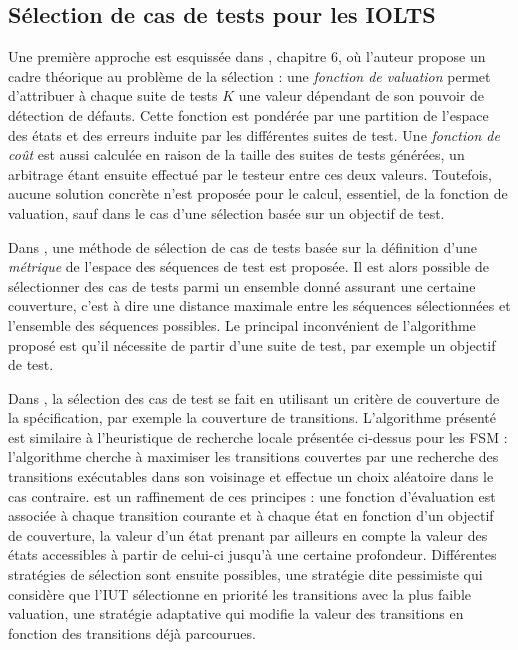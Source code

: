 \subsection{S\'election de cas de tests pour les \textsf{IOLTS}}
\label{sec:selection-iolts}

Une premi\`ere approche est esquiss\'ee dans \cite{thtretmans},
chapitre 6, o\`u l'auteur propose un cadre th\'eorique au probl\`eme
de la s\'election : une \emph{fonction de valuation} permet d'attribuer \`a
chaque suite de tests $K$ une valeur d\'ependant de son pouvoir de
d\'etection de d\'efauts. Cette fonction est pond\'er\'ee par une partition
de l'espace des \'etats et des erreurs induite par les diff\'erentes
suites de test. Une \emph{fonction de co\^ut} est aussi calcul\'ee
en raison de la taille des suites de tests g\'en\'er\'ees, un
arbitrage \'etant ensuite effectu\'e par le testeur entre ces deux
valeurs. Toutefois, aucune solution concr\`ete n'est propos\'ee pour
le calcul, essentiel, de la fonction de valuation, sauf dans le cas
d'une s\'election bas\'ee sur un objectif de test.

Dans \cite{curgus-analytic-test}, une m\'ethode de s\'election de
cas de tests bas\'ee  sur la d\'efinition d'une \emph{m\'etrique}  de l'espace des
s\'equences de test est propos\'ee. Il est alors possible de
s\'electionner des cas de tests parmi un ensemble donn\'e assurant
une certaine couverture, c'est \`a dire une distance maximale entre
les s\'equences s\'electionn\'ees et l'ensemble des s\'equences
possibles. Le principal inconv\'enient de l'algorithme propos\'e est
qu'il n\'ecessite de partir d'une suite de test, par exemple un
objectif de test. 

Dans \cite{spec-coverage-select,pyhala-test-selection}, la s\'election des cas de test se
fait en utilisant un crit\`ere de couverture de la sp\'ecification,
par exemple la couverture de transitions.  L'algorithme pr\'esent\'e
est similaire \`a l'heuristique de recherche locale pr\'esent\'ee
ci-dessus pour les \textsf{FSM} : l'algorithme cherche \`a maximiser les
transitions couvertes par une recherche des transitions ex\'ecutables
dans son voisinage et effectue un choix al\'eatoire
dans le cas contraire. \cite{kervinen-heuristic} est un raffinement de ces principes :
une fonction d'\'evaluation est associ\'ee \`a chaque transition
courante et \`a chaque \'etat en fonction d'un objectif de
couverture, la valeur d'un \'etat prenant par ailleurs en compte la
valeur des \'etats accessibles \`a partir de
celui-ci jusqu'\`a une certaine profondeur. Diff\'erentes strat\'egies de s\'election sont ensuite
possibles, une strat\'egie dite pessimiste qui consid\`ere que l'\textsf{IUT}
s\'electionne en priorit\'e les transitions avec la plus faible
valuation, une strat\'egie adaptative qui modifie la valeur des
transitions en fonction des transitions d\'ej\`a parcourues.

